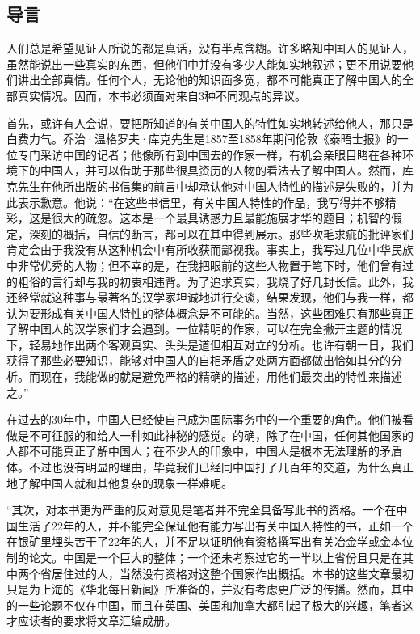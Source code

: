 \documentclass[12pt,oneside]{book}
\begin{document}
\setcounter{tocdepth}{2}
\tableofcontents

\begin{common-format}
\mainmatter

\chapter{导言}
人们总是希望见证人所说的都是真话，没有半点含糊。许多略知中国人的见证人，虽然能说出一些真实的东西，但他们中并没有多少人能如实地叙述；更不用说要他们讲出全部真情。任何个人，无论他的知识面多宽，都不可能真正了解中国人的全部真实情况。因而，本书必须面对来自3种不同观点的异议。 

首先，或许有人会说，要把所知道的有关中国人的特性如实地转述给他人，那只是白费力气。乔治·温格罗夫·库克先生是1857至1858年期间伦敦《泰晤士报》的一位专门采访中国的记者；他像所有到中国去的作家一样，有机会亲眼目睹在各种环境下的中国人，并可以借助于那些很具资历的人物的看法去了解中国人。然而，库克先生在他所出版的书信集的前言中却承认他对中国人特性的描述是失败的，并为此表示歉意。他说：“在这些书信里，有关中国人特性的作品，我写得并不够精彩，这是很大的疏忽。这本是一个最具诱惑力且最能施展才华的题目；机智的假定，深刻的概括，自信的断言，都可以在其中得到展示。那些吹毛求疵的批评家们肯定会由于我没有从这种机会中有所收获而鄙视我。事实上，我写过几位中华民族中非常优秀的人物；但不幸的是，在我把眼前的这些人物置于笔下时，他们曾有过的粗俗的言行却与我的初衷相违背。为了追求真实，我烧了好几封长信。此外，我还经常就这种事与最著名的汉学家坦诚地进行交谈，结果发现，他们与我一样，都认为要形成有关中国人特性的整体概念是不可能的。当然，这些困难只有那些真正了解中国人的汉学家们才会遇到。一位精明的作家，可以在完全撇开主题的情况下，轻易地作出两个客观真实、头头是道但相互对立的分析。也许有朝一日，我们获得了那些必要知识，能够对中国人的自相矛盾之处两方面都做出恰如其分的分析。而现在，我能做的就是避免严格的精确的描述，用他们最突出的特性来描述之。” 

在过去的30年中，中国人已经使自己成为国际事务中的一个重要的角色。他们被看做是不可征服的和给人一种如此神秘的感觉。的确，除了在中国，任何其他国家的人都不可能真正了解中国人；在不少人的印象中，中国人是根本无法理解的矛盾体。不过也没有明显的理由，毕竟我们已经同中国打了几百年的交道，为什么真正地了解中国人就和其他复杂的现象一样难呢。 

“其次，对本书更为严重的反对意见是笔者并不完全具备写此书的资格。一个在中国生活了22年的人，并不能完全保证他有能力写出有关中国人特性的书，正如一个在银矿里埋头苦干了22年的人，并不足以证明他有资格撰写出有关冶金学或金本位制的论文。中国是一个巨大的整体；一个还未考察过它的一半以上省份且只是在其中两个省居住过的人，当然没有资格对这整个国家作出概括。本书的这些文章最初只是为上海的《华北每日新闻》所准备的，并没有考虑更广泛的传播。然而，其中的一些论题不仅在中国，而且在英国、美国和加拿大都引起了极大的兴趣，笔者这才应读者的要求将文章汇编成册。 


\end{common-format}
\end{document}
